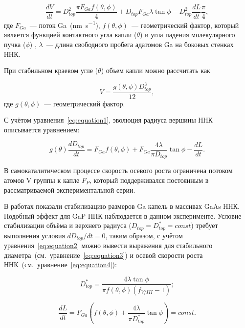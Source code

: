 \begin{equation} \label{eq:equation1} \frac{dV}{dt}=D_{top}^2 \frac{\pi F_{Ga}
	f(\theta,\phi)}{4}+ D_{top} F_{Ga} \lambda \tan{\phi} - D_{top}^2 \frac{dL}{dt}
	\frac{\pi}{4},
\end{equation}
где \(F_{Ga}\)~--- поток Ga~(\si{\nano\meter\per\second}),
\(f(\theta,\phi)\)~--- геометрический фактор, который является функцией
контактного угла капли (\(\theta\)) и угла падения молекулярного пучка
(\(\phi\)) \cite{glas2010vapor}, \(\lambda\)~--- длина свободного пробега
адатомов Ga на боковых стенках ННК.

При стабильном краевом угле (\(\theta\)) объем капли можно рассчитать как

\begin{equation}
	\label{eq:equation7} V=\frac{g(\theta,\phi)D_{top}^3}{12},
\end{equation}
где \(g(\theta,\phi)\)~--- геометрический фактор.

С учётом уравнения~\ref{eq:equation1}, эволюция радиуса вершины ННК описывается
уравнением:

\begin{equation} \label{eq:equation2} g(\theta) \frac{dD_{top}}{dt}=F_{Ga}
	f(\theta,\phi)+ F_{Ga} \frac{4 \lambda}{\pi D_{top}} \tan{\phi}-\frac{dL}{dt}.
\end{equation}

В самокаталитическом процессе скорость осевого роста ограничена потоком атомов
V группы к капле \(F_P\), который поддерживался постоянным в рассматриваемой
экспериментальной серии.

В работах
\cite{tersoff2015stable,dubrovskii2016regimes,berdnikov2020comparison} показали
стабилизацию размеров Ga капель в массивах GaAs ННК. Подобный эффект для GaP
ННК наблюдается в данном эксперименте. Условие стабилизации объёма и верхнего
радиуса (\(D_{top} = D_{top}^\ast = const\)) требует выполнения условия
\(dD_{top} / dt = 0\), таким образом, с учётом уравнения~\ref{eq:equation2}
можно вывести выражения для стабильного
диаметра~(см.~уравнение~\ref{eq:equation3}) и осевой скорости роста
ННК~(см.~уравнение~\ref{eq:equation4}):

\begin{equation} \label{eq:equation3} D_{top}^\ast=\frac{4 \lambda
\tan{\phi}}{\pi f(\theta,\phi)(f_{V/III}-1)}; \end{equation}

\begin{equation} \label{eq:equation4} \frac{dL}{dt}=F_{Ga} \left(
	f(\theta,\phi) + \frac{4 \lambda}{\pi D_{top}^\ast}\tan{\phi} \right)=const.
\end{equation}

